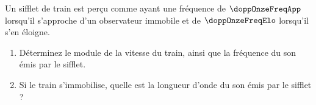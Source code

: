 Un sifflet de train est perçu comme ayant une fréquence de $\doppOnzeFreqApp$ lorsqu’il s’approche d’un observateur immobile et de $\doppOnzeFreqElo$ lorsqu’il s’en éloigne.
\begin{enumerate}[label=\alph*)]
    \item Déterminez le module de la vitesse du train, ainsi que la fréquence du son émis par le sifflet.
    \item Si le train s’immobilise, quelle est la longueur d’onde du son émis par le sifflet ?
\end{enumerate}
